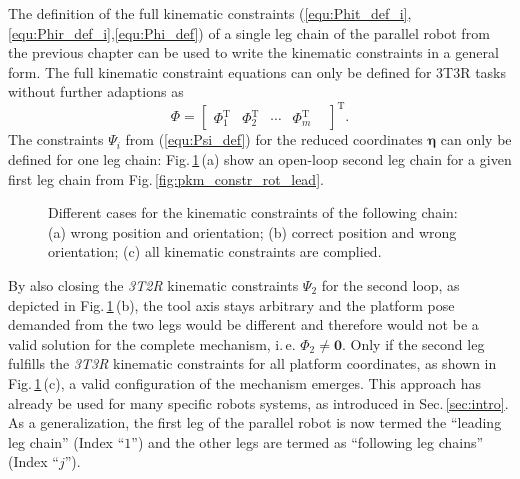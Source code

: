 \documentclass[robotics,article,submit,moreauthors,pdftex]{Definitions/mdpi}
\newcommand{\bm}[1]{\boldsymbol{#1}}
\newcommand{\transp}[0]{{\mathrm{T}}}
\let\Phi\varPhi
\let\Psi\varPsi
\begin{document}
The definition of the full kinematic constraints (\ref{equ:Phit_def_i},\ref{equ:Phir_def_i},\ref{equ:Phi_def}) of a single leg chain of the parallel robot from the previous chapter can be used to write the kinematic constraints
in a general form.
%
The full kinematic constraint equations can only be defined for 3T3R tasks without further adaptions as
%
\begin{equation}
\bm{\Phi}
=
\begin{bmatrix}
\bm{\Phi}_1^\transp &
\bm{\Phi}_2^\transp &
\cdots &
\bm{\Phi}_m^\transp &
\end{bmatrix}^\transp.
\label{equ:constr_Phi_PKM}
\end{equation}
%
The constraints $\bm{\Psi}_i$ from (\ref{equ:Psi_def}) for the reduced coordinates $\bm{\eta}$ can only be defined for one leg chain:
Fig.\,\ref{fig:pkm_constr_rot_follow}\,(a) show an open-loop second leg chain for a given first leg chain from Fig.\,\ref{fig:pkm_constr_rot_lead}.
%
\begin{figure}[b]
    
    \caption{Different cases for the kinematic constraints of the following chain: (a) wrong position and orientation; (b) correct position and wrong orientation; (c) all kinematic constraints are complied.}
    \label{fig:pkm_constr_rot_follow}
\end{figure} 
%
By also closing the \emph{3T2R} kinematic constraints $\bm{\Psi}_2$ for the second loop, as depicted in Fig.\,\ref{fig:pkm_constr_rot_follow}\,(b), the tool axis stays arbitrary and the platform pose demanded from the two legs would be different and therefore would not be a valid solution for the complete mechanism, i.\,e. $\bm{\Phi}_2 \ne \bm{0}$.
Only if the second leg fulfills the \emph{3T3R} kinematic constraints for all platform coordinates, as shown in Fig.\,\ref{fig:pkm_constr_rot_follow}\,(c), a valid configuration of the mechanism emerges.
This approach has already be used for many specific robots systems, as introduced in Sec.\,\ref{sec:intro}.
As a generalization, the first leg of the parallel robot is now termed the ``leading leg chain'' (Index ``$1$'') and the other legs are termed as ``following leg chains'' (Index ``$j$'').
\end{document}
